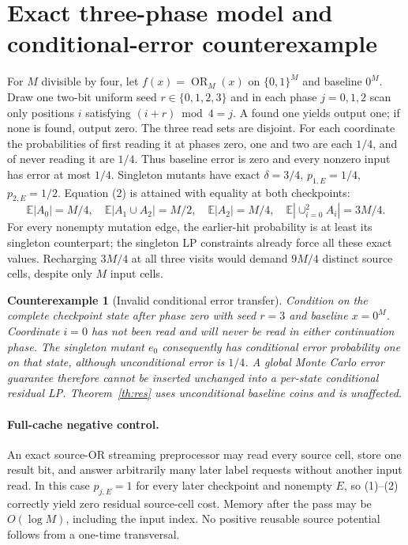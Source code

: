 \documentclass[11pt]{article}
\newtheorem{counterexample}[theorem]{Counterexample}
\begin{document}
\section{Exact three-phase model and conditional-error counterexample}
For $M$ divisible by four, let $f(x)=\operatorname{OR}_M(x)$ on
$\{0,1\}^M$ and baseline $0^M$. Draw one two-bit uniform seed
$r\in\{0,1,2,3\}$ and in each phase $j=0,1,2$ scan only positions
$i$ satisfying $(i+r)\bmod4=j$. A found one yields output one;
if none is found, output zero. The three read sets are disjoint.
For each coordinate the probabilities of first reading it at phases
zero, one and two are each $1/4$, and of never reading it are $1/4$.
Thus baseline error is zero and every nonzero input has error at
most $1/4$. Singleton mutants have exact $\delta=3/4$,
$p_{1,E}=1/4$, $p_{2,E}=1/2$.
Equation (2) is attained with equality at both checkpoints:
\[
\mathbb E|A_0|=M/4,\quad
\mathbb E|A_1\cup A_2|=M/2,\quad
\mathbb E|A_2|=M/4,\quad
\mathbb E|\cup_{i=0}^{2}A_i|=3M/4.
\]
For every nonempty mutation edge, the earlier-hit probability is at
least its singleton counterpart; the singleton LP constraints already
force all these exact values. Recharging $3M/4$ at all three visits
would demand $9M/4$ distinct source cells, despite only $M$ input cells.

\begin{counterexample}[Invalid conditional error transfer]
\label{ce:conditional}
Condition on the complete checkpoint state after phase zero with
seed $r=3$ and baseline $x=0^M$. Coordinate $i=0$ has not been read
and will never be read in either continuation phase. The singleton
mutant $e_0$ consequently has \emph{conditional} error probability one
on that state, although unconditional error is $1/4$.
A global Monte Carlo error guarantee therefore cannot be inserted
unchanged into a per-state conditional residual LP. Theorem~\ref{th:res}
uses \emph{unconditional} baseline coins and is unaffected.
\end{counterexample}

\paragraph{Full-cache negative control.}
An exact source-OR streaming preprocessor may read every source cell,
store one result bit, and answer arbitrarily many later label requests
without another input read. In this case $p_{j,E}=1$ for every
later checkpoint and nonempty $E$, so (1)--(2) correctly yield
zero residual source-cell cost. Memory after the pass may be
$O(\log M)$, including the input index. No positive reusable
source potential follows from a one-time transversal.
\end{document}
